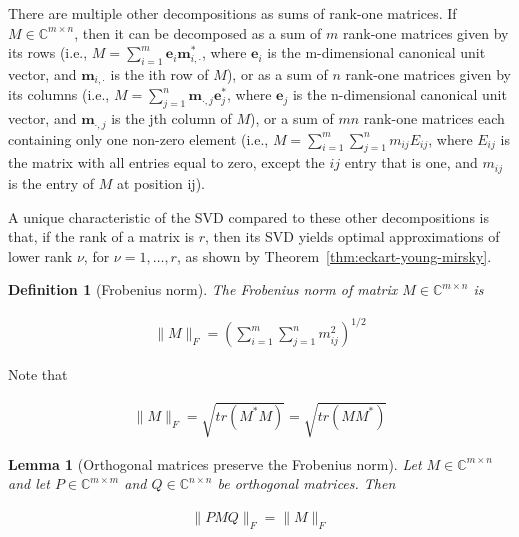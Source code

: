 \documentclass[12pt]{article}
\newtheorem{definition}{Definition}
\newtheorem{lemma}{Lemma}
\begin{document}
\begin{appendices}
    There are multiple other decompositions as sums of rank-one matrices. If
    $M\in\mathbb{C}^{m\times n}$, then it can be decomposed as a sum of $m$
    rank-one matrices given by its rows (i.e.,
    $M=\sum_{i=1}^m\mathbf{e}_i\mathbf{m}_{i,\cdot}^*$, where $\mathbf{e}_i$ is
    the m-dimensional canonical unit vector, and $\mathbf{m}_{i,\cdot}$ is the ith row
    of $M$), or as a sum of $n$ rank-one matrices given by its columns (i.e.,
    $M=\sum_{j=1}^n\mathbf{m}_{\cdot,j}\mathbf{e}_j^*$, where $\mathbf{e}_j$ is
    the n-dimensional canonical unit vector, and $\mathbf{m}_{\cdot,j}$ is the jth
    column of $M$), or a sum of $mn$ rank-one matrices each containing only one
    non-zero element (i.e., $M=\sum_{i=1}^m\sum_{j=1}^nm_{ij}E_{ij}$, where
    $E_{ij}$ is the matrix with all entries equal to zero, except the $ij$
    entry that is one, and $m_{ij}$ is the entry of $M$ at position ij).

    A unique characteristic of the SVD compared to these other decompositions
    is that, if the rank of a matrix is $r$, then its SVD yields optimal
    approximations of lower rank $\nu$, for $\nu=1,\ldots,r$, as shown by
    Theorem~\ref{thm:eckart-young-mirsky}.

    \begin{definition}[Frobenius norm]
        The Frobenius norm of matrix $M\in\mathbb{C}^{m\times n}$ is

        \begin{align*}
            \|M\|_F=\left(\sum_{i=1}^m\sum_{j=1}^nm_{ij}^2\right)^{1/2}
        \end{align*}

    \end{definition}

    Note that

    \begin{align}
        \|M\|_F=\sqrt{tr(M^*M)}=\sqrt{tr(MM^*)}
        \label{eq:frobeniusAsTrace}
    \end{align}

    \begin{lemma}[Orthogonal matrices preserve the Frobenius norm]
        Let $M\in\mathbb{C}^{m\times n}$ and let $P\in\mathbb{C}^{m\times m}$
        and $Q\in\mathbb{C}^{n\times n}$ be orthogonal matrices. Then

        \begin{align*}
            \|PMQ\|_F=\|M\|_F
        \end{align*}

        \label{lemma:orthogonalPreserveF}
    \end{lemma}


\end{appendices}
\end{document}
